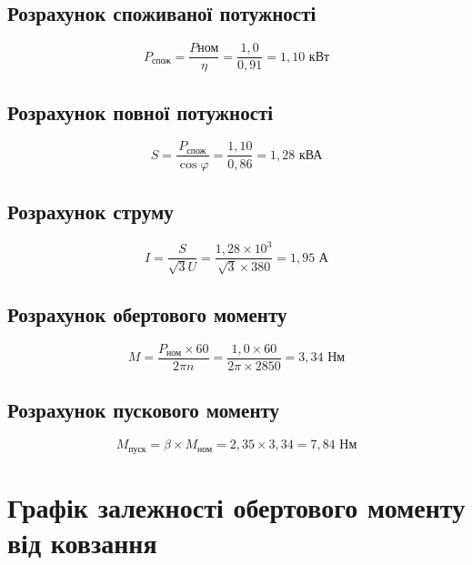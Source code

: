 \documentclass[a4paper]{article}
\begin{document}
    \subsection*{Розрахунок споживаної потужності}
    \begin{equation}
        P_{\text{спож}} = \frac{P{\text{ном}}}{\eta} = \frac{1,0}{0,91} = 1,10 \text{ кВт}
    \end{equation}

    \subsection*{Розрахунок повної потужності}
    \begin{equation}
        S = \frac{P_{\text{спож}}}{\cos \varphi} = \frac{1,10}{0,86} = 1,28 \text{ кВА}
    \end{equation}

    \subsection*{Розрахунок струму}
    \begin{equation}
        I = \frac{S}{\sqrt{3} U} = \frac{1,28 \times 10^3}{\sqrt{3} \times 380} = 1,95 \text{ А}
    \end{equation}

    \subsection*{Розрахунок обертового моменту}
    \begin{equation}
        M = \frac{P_{\text{ном}} \times 60}{2 \pi n} = \frac{1,0 \times 60}{2 \pi \times 2850} = 3,34 \text{ Нм}
    \end{equation}

    \subsection*{Розрахунок пускового моменту}
    \begin{equation}
        M_{\text{пуск}} = \beta \times M_{\text{ном}} = 2,35 \times 3,34 = 7,84 \text{ Нм}
    \end{equation}

    \section*{Графік залежності обертового моменту від ковзання}
\end{document}
